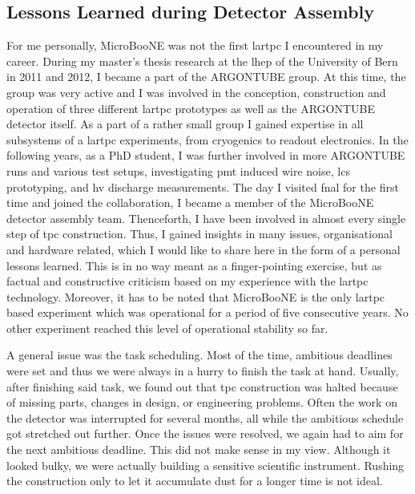\subsection{Lessons Learned during Detector Assembly} \label{sec:MicroBooNELessonsLearned}
For me personally, MicroBooNE was not the first \gls{lartpc} I encountered in my career. During my master's thesis research at the \gls{lhep} of the University of Bern in 2011 and 2012, I became a part of the ARGONTUBE group. At this time, the group was very active and I was involved in the conception, construction and operation of three different \gls{lartpc} prototypes as well as the ARGONTUBE detector itself. As a part of a rather small group I gained expertise in all subsystems of a \gls{lartpc} experiments, from cryogenics to readout electronics. In the following years, as a PhD student, I was further involved in more ARGONTUBE runs and various test setups, \ia investigating \gls{pmt} induced wire noise, \gls{lcs} prototyping, and \gls{hv} discharge measurements. The day I visited \gls{fnal} for the first time and joined the collaboration, I became a member of the MicroBooNE detector assembly team. Thenceforth, I have been involved in almost every single step of \gls{tpc} construction. Thus, I gained insights in many issues, organisational and hardware related, which I would like to share here in the form of a personal lessons learned. This is in no way meant as a finger-pointing exercise, but as factual and constructive criticism based on my experience with the \gls{lartpc} technology. Moreover, it has to be noted that MicroBooNE is the only \gls{lartpc} based experiment which was operational for a period of five consecutive years. No other experiment reached this level of operational stability so far.

A general issue was the task scheduling. Most of the time, ambitious deadlines were set and thus we were always in a hurry to finish the task at hand. Usually, after finishing said task, we found out that \gls{tpc} construction was halted because of missing parts, changes in design, or engineering problems. Often the work on the detector was interrupted for several months, all while the ambitious schedule got stretched out further. Once the issues were resolved, we again had to aim for the next ambitious deadline. This did not make sense in my view. Although it looked bulky, we were actually building a sensitive scientific instrument. Rushing the construction only to let it accumulate dust for a longer time is not ideal. 

